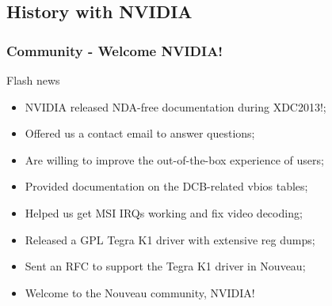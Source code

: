 \documentclass[11pt,english,compress]{beamer}
\begin{document}
\subsection{History with NVIDIA}
\begin{frame}
	\frametitle{Community - Welcome NVIDIA!}


	\begin{block}{Flash news}
		\begin{itemize}
			\item NVIDIA released NDA-free documentation during
XDC2013!;
			\item Offered us a contact email to answer questions;
			\item Are willing to improve the out-of-the-box
experience of users;
			\item Provided documentation on the DCB-related vbios
tables;
			\item Helped us get MSI IRQs working and fix video
decoding;
			\item Released a GPL Tegra K1 driver with extensive reg
dumps;
			\item Sent an RFC to support the Tegra K1 driver in Nouveau;
			\item Welcome to the Nouveau community, NVIDIA!
		\end{itemize}
	\end{block}
\end{frame}
\end{document}
